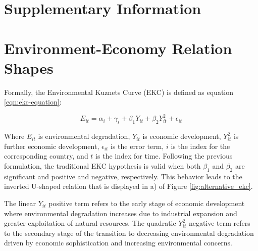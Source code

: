 
\renewcommand{\appendixname}{}

\newcommand{\beginsupplement}{
	\setcounter{table}{0}
	\renewcommand{\thetable}{S\arabic{table}}
	\setcounter{figure}{0}
	\renewcommand{\thefigure}{S\arabic{figure}}
	\setcounter{equation}{0} 	
	\renewcommand{\theequation}{S\arabic{equation}}
	\setcounter{section}{0} 	
	\renewcommand{\thesection}{S\Alph{section}}
	}

\begin{appendices}

\begin{center}
	\usebox{\mytitlebox}
\end{center}

\vspace{2em}

\section*{\Huge Supplementary Information}
\beginsupplement
\section{Environment-Economy Relation Shapes}
Formally, the Environmental Kuznets Curve (EKC) is defined as equation \eqref{eqn:ekc-equation}:

\begin{equation}\label{eqn:ekc-equation}
	E_{it} = \alpha_{i} + \gamma_{t} + \beta_{1}Y_{it} + \beta_{2}Y_{it}^{2} + \epsilon_{it}
\end{equation}

Where $E_{it}$ is environmental degradation, $Y_{it}$ is economic development, $Y_{it}^{2}$ is further economic development, $\epsilon_{it}$ is the error term, $i$ is the index for the corresponding country, and $t$ is the index for time. Following the previous formulation, the traditional EKC hypothesis is valid when both $\beta_{1}$ and $\beta_{2}$ are significant and positive and negative, respectively. This behavior leads to the inverted U-shaped relation that is displayed in a) of Figure \ref{fig:alternative_ekc}.

The linear $Y_{it}$ positive term refers to the early stage of economic development where environmental degradation increases due to industrial expansion and greater exploitation of natural resources. The quadratic $Y_{it}^{2}$ negative term refers to the secondary stage of the transition to decreasing environmental degradation driven by economic sophistication and increasing environmental concerns.


\end{appendices}
